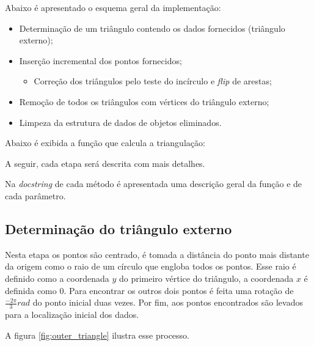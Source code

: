 \documentclass[a4paper]{article}
\begin{document}
Abaixo é apresentado o esquema geral da implementação:
\begin{itemize}
	\item Determinação de um triângulo contendo os dados fornecidos (triângulo externo);
	
	\item Inserção incremental dos pontos fornecidos;
	\begin{itemize}
			\item Correção dos triângulos pelo teste do incírculo e \textit{flip} de arestas;
	\end{itemize}
	
	\item Remoção de todos os triângulos com vértices do triângulo externo;
	
	\item Limpeza da estrutura de dados de objetos eliminados.
	
\end{itemize}

Abaixo é exibida a função que calcula a triangulação:



A seguir, cada etapa será descrita com mais detalhes.

Na \textit{docstring} de cada método é apresentada uma descrição geral da função e de cada parâmetro.

\subsection{Determinação do triângulo externo}

Nesta etapa os pontos são centrado, é tomada a distância do ponto mais distante da origem como o raio de um círculo que engloba todos os pontos. Esse raio é definido como a coordenada $y$ do primeiro vértice do triângulo, a coordenada $x$ é definida como $0$. Para encontrar os outros dois pontos é feita uma rotação de $\frac{-2\pi}{3} rad$ do ponto inicial duas vezes. Por fim, aos pontos encontrados são levados para a localização inicial dos dados.

A figura \ref{fig:outer_triangle} ilustra esse processo.
\end{document}
